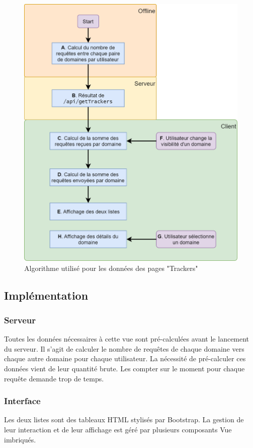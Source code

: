 			\begin{figure}[!h]
				\centering
				\includegraphics[height=0.95\textwidth]{images/design/pages/trackers_algo}
				\caption{Algorithme utilisé pour les données des pages "Trackers"}
				\label{trackers_algo}
			\end{figure}

	\subsection{Implémentation}

		\subsubsection{Serveur}

			Toutes les données nécessaires à cette vue sont pré-calculées avant le lancement du serveur. Il s'agit de calculer le nombre de requêtes de chaque domaine vers chaque autre domaine pour chaque utilisateur. La nécessité de pré-calculer ces données vient de leur quantité brute. Les compter sur le moment pour chaque requête demande trop de temps.

		\subsubsection{Interface}

			Les deux listes sont des tableaux HTML stylisés par Bootstrap. La gestion de leur interaction et de leur affichage est géré par plusieurs composants Vue imbriqués.

